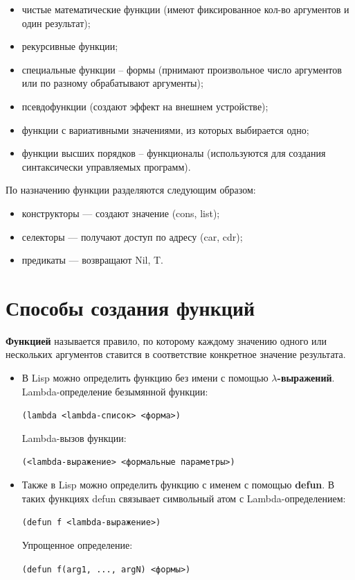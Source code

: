 \documentclass[a4paper,14pt, unknownkeysallowed]{extreport}
\begin{document}
\begin{itemize}
	\item чистые математические функции (имеют фиксированное кол-во аргументов и один результат);
	\item рекурсивные функции;
	\item специальные функции -- формы (прнимают произвольное число аргументов или по разному обрабатывают аргументы);
	\item псевдофункции (создают эффект на внешнем устройстве);
	\item функции с вариативными значениями, из которых выбирается одно;
	\item функции высших порядков -- функционалы (используются для создания синтаксически управляемых программ).
\end{itemize}

По назначению функции разделяются следующим образом:

\begin{itemize}
	\item конструкторы — создают значение (cons, list);
	\item селекторы — получают доступ по адресу (car, cdr); 
	\item предикаты — возвращают Nil, T.
\end{itemize}

\section{Способы создания функций}

\textbf{Функцией} называется правило, по которому каждому значению одного или нескольких аргументов ставится в соответствие конкретное значение результата.

\begin{itemize}
	\item В Lisp можно определить функцию без имени с помощью \textbf{$\lambda$-выражений}. 
	Lambda-определение безымянной функции:
	
	\begin{center}
	\texttt{(lambda <lambda-список> <форма>)}
	\end{center}

	Lambda-вызов функции:

	\begin{center}
	\texttt{(<lambda-выражение> <формальные параметры>)}
	\end{center}

	\item Также в Lisp можно определить функцию с именем с помощью \textbf{defun}. В таких функциях defun связывает символьный атом с Lambda-определением:
	
	\begin{center}
	\texttt{(defun f <lambda-выражение>)}
	\end{center}

	Упрощенное определение:

	\begin{center}
	\texttt{(defun f(arg1, ..., argN) <формы>)}
	\end{center}

\end{itemize}
\end{document}
